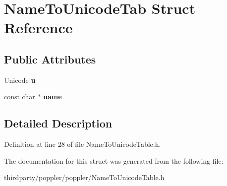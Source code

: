 \hypertarget{struct_name_to_unicode_tab}{}\section{Name\+To\+Unicode\+Tab Struct Reference}
\label{struct_name_to_unicode_tab}
\subsection*{Public Attributes}
\begin{DoxyCompactItemize}
\item 
\mbox{\label{struct_name_to_unicode_tab_a83af3bda4db2cb25ac75043657b9b89e}} 
Unicode {\bfseries u}
\item 
\mbox{\label{struct_name_to_unicode_tab_a8a6d9892c3575b4c4e9723c9e53bbc4d}} 
const char $\ast$ {\bfseries name}
\end{DoxyCompactItemize}


\subsection{Detailed Description}


Definition at line 28 of file Name\+To\+Unicode\+Table.\+h.



The documentation for this struct was generated from the following file\+:\begin{DoxyCompactItemize}
\item 
thirdparty/poppler/poppler/Name\+To\+Unicode\+Table.\+h\end{DoxyCompactItemize}
